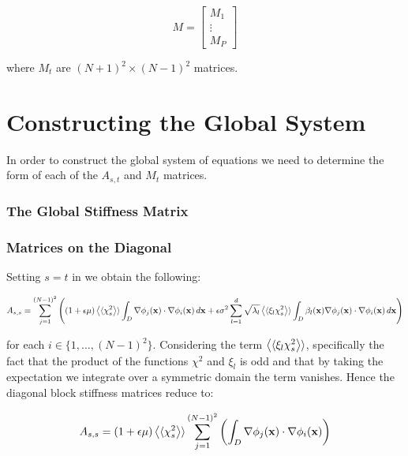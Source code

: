 \begin{equation}
    M = \left[\begin{array}{c}
            M_1 \\ \vdots \\ M_P
    \end{array}\right]
\end{equation}

where $M_t$ are $(N+1)^2 \times (N-1)^2$ matrices.

\section{Constructing the Global System}

In order to construct the global system of equations we need to determine the
form of each of the $A_{s,t}$ and $M_t$ matrices.

\subsubsection{The Global Stiffness Matrix}

\subsubsection{Matrices on the Diagonal}

Setting $s = t$ in  we obtain the following:

\begin{equation}
    A_{s,s} = \sum_{j=1}^{(N-1)^2}\left(
(1 + \epsilon\mu)\left\langle\langle\chi_s^2\right\rangle\rangle
      \int_D\nabla\phi_j(\mathbf{x})\cdot\nabla\phi_i(\mathbf{x})\, d\mathbf{x} +
      \epsilon\sigma^2\sum_{l=1}^d\sqrt{\lambda_l}\left\langle\langle\xi_l\chi_s^2\right\rangle\rangle
      \int_D\beta_l(\mathbf{x})\nabla\phi_j(\mathbf{x})\cdot\nabla\phi_i(\mathbf{x})\, d\mathbf{x}
      \right)
\end{equation}

for each $i \in \{1,\ldots,(N-1)^2\}$. Considering the term
$\left\langle\langle\xi_l\chi_s^2\right\rangle\rangle$, specifically the fact that the product of the
functions $\chi^2$ and $\xi_l$ is odd and that by taking the expectation we
integrate over a symmetric domain the term vanishes. Hence the diagonal block
stiffness matrices reduce to:

\begin{equation}
    A_{s,s} = (1 + \epsilon\mu)\left\langle\langle\chi_s^2\right\rangle\rangle
    \sum_{j=1}^{(N-1)^2}\left(\int_D\nabla\phi_j(\mathbf{x})\cdot\nabla\phi_i(\mathbf{x})\right)
\end{equation}

